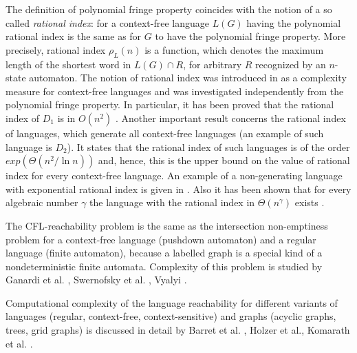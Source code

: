 \documentclass[smallextended]{svjour3}       %
\begin{document}
The definition of polynomial fringe property coincides with the notion of a so called \textit{rational index}: for a context-free language $L(G)$ having the polynomial rational index is the same as for $G$ to have the polynomial fringe property. More precisely, rational index $\rho_L(n)$ is a function, which denotes the maximum length of the shortest word in $L(G) \cap R$, for arbitrary $R$ recognized by an $n$-state automaton. The notion of rational index was introduced in \cite{RatBasic} as a complexity measure for context-free languages and was investigated independently from the polynomial fringe property.  In particular, it has been proved that the rational index of $D_1$ is in $O( n^2)$ \cite{Dyck1}. 
Another important result concerns the rational index of languages, which generate all context-free languages (an example of such language is $D_2$). It states that the rational index of such languages is of the order $exp(\Theta(n^2/\ln n))$ \cite{CFRat} and, hence, this is the upper bound on the value of rational index for every context-free language. An example of a non-generating language with exponential rational index is given in \cite{Regularrealizability}. Also it has been shown that for every algebraic number $\gamma $ the language with the rational index in $\Theta (n^\gamma )$ exists \cite{GreibRat}. 


The CFL-reachability problem is the same as the intersection non-emptiness problem for a context-free language (pushdown automaton) and a regular language (finite automaton), because a labelled graph is a special kind of a nondeterministic finite automata. Complexity of this problem is studied by Ganardi et al. \cite{ ganardi2016circuit} ,  Swernofsky et al. \cite{Intersection}, Vyalyi \cite{VyalyiRR}.


Computational complexity of the language reachability for different variants of languages (regular, context-free, context-sensitive) and graphs (acyclic graphs, trees, grid graphs) is discussed in detail by Barret et al. \cite{Barrett}, Holzer et al.\cite{LabelledGraphs}, Komarath et al. \cite{LReach}. 
\end{document}
